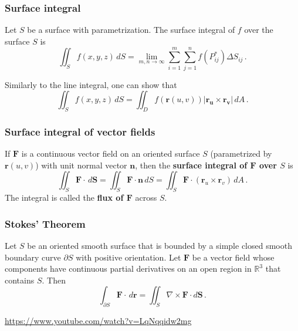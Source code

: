 \documentclass[aspectratio=169]{beamer}
\begin{document}
\begin{frame}
    \frametitle{Surface integral}

\begin{definition}
Let \(S\) be a surface with parametrization.
The surface integral of \(f\) over the surface \(S\) is
\begin{equation*}
    \iint_S f(x,y,z) \, dS = \lim_{m,n\to \infty} \sum_{i=1}^m \sum_{j=1}^n f(P_{ij}^*) \Delta S_{ij} \,.
\end{equation*}
\end{definition}

Similarly to the line integral,
one can show that
\begin{equation*}
   \iint_S f(x,y,z) \, dS  = \iint_D f(\mathbf{r}(u,v)) | \mathbf{r_u}\times \mathbf{r_v} | \, dA \,. 
\end{equation*}
\end{frame}

\begin{frame}
    \frametitle{Surface integral of vector fields}
\begin{definition}
If \(\mathbf{F}\) is a continuous vector field on an oriented surface \(S\) (parametrized by \(\mathbf{r}(u,v)\))
with unit normal vector \(\mathbf{n}\), then the \textbf{surface integral of \(\mathbf{F}\) over
\(S\)} is
\begin{equation*}
    \iint_S \mathbf{F}\cdot \, d\mathbf{S} = \iint_S \mathbf{F}\cdot \mathbf{n} \, dS 
    = \iint_S \mathbf{F}\cdot (\mathbf{r}_u\times \mathbf{r}_v) \, dA \,.
\end{equation*}
The integral is called the \textbf{flux of \(\mathbf{F}\)} across \(S\).
\end{definition}
\end{frame}


\begin{frame}
    \frametitle{Stokes' Theorem}
    \begin{theorem}
Let \(S\) be an oriented smooth surface that is bounded by a simple closed
smooth boundary curve \(\partial S\) with positive orientation.
Let \(\mathbf{F}\) be a vector field whose components have continuous partial
derivatives on an open region in \(\mathbb{R}^3\) that contains \(S\).
Then
\begin{equation*}
    \int_{\partial S} \mathbf{F} \cdot \, d\mathbf{r} = \iint_S \nabla \times \mathbf{F} \cdot d\mathbf{S} \,.
\end{equation*}
\end{theorem}
\url{https://www.youtube.com/watch?v=LqNqqidw2mg}
\end{frame}
\end{document}
